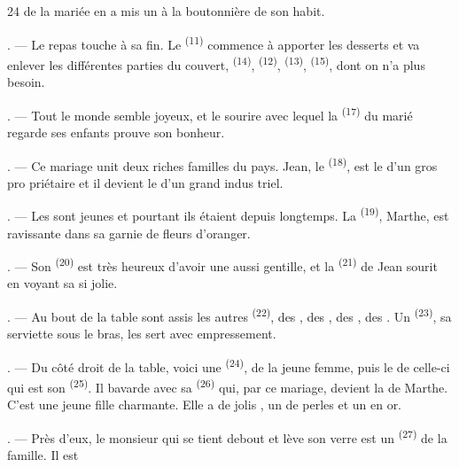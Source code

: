 \begin{VUpage}[26]{24}
\VUcontinue
de la mariée en a mis un à la boutonnière de son\nl
habit.

. --- Le repas touche à sa fin. Le  \textsuperscript{(11)}\nl
commence à apporter les desserts et va enlever les\nl
différentes parties du couvert,  \textsuperscript{(14)}, \cc
{} \textsuperscript{(12)},  \textsuperscript{(13)},  \textsuperscript{(15)}, dont on n'a\nl
plus besoin.

. --- Tout le monde semble joyeux, et le sourire\nl
avec lequel la  \textsuperscript{(17)} du marié regarde ses enfants\nl
prouve son bonheur.

. --- Ce mariage unit deux riches familles du\nl
pays. Jean, le  \textsuperscript{(18)}, est le  d'un gros pro\cc
priétaire et il devient le  d'un grand indus\cc
triel.

. --- Les  sont jeunes et pourtant ils étaient\nl
{} depuis longtemps. La  \textsuperscript{(19)},\nl
Marthe, est ravissante dans sa  garnie\nl
de fleurs d'oranger.

. --- Son  \textsuperscript{(20)} est très heureux d'avoir\nl
une  aussi gentille, et la  \textsuperscript{(21)} de Jean\nl
sourit en voyant sa  si jolie.

. --- Au bout de la table sont assis les autres\nl
{} \textsuperscript{(22)}, des , des , des ,\nl
des . Un  \textsuperscript{(23)}, sa serviette\nl
sous le bras, les sert avec empressement.

. --- Du côté droit de la table, voici une \cc
{} \textsuperscript{(24)},  de la jeune femme, puis le \nl
de celle-ci qui est son  \textsuperscript{(25)}. Il\nl
bavarde avec sa  \textsuperscript{(26)} qui, par\nl
ce mariage, devient la  de Marthe. C'est\nl
une jeune fille charmante. Elle a de jolis ,\nl
un  de perles et un  en or.

. --- Près d'eux, le monsieur qui se tient debout\nl
et lève son verre est un  \textsuperscript{(27)} de la famille. Il est
\parplein
\end{VUpage}

